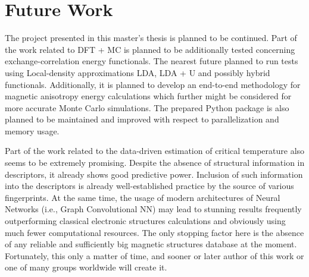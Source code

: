 \section{Future Work}

The project presented in this master's thesis is planned to be continued.
Part of the work related to DFT + MC  is planned to be additionally tested concerning exchange-correlation energy functionals. The nearest future planned to run tests using Local-density approximations LDA, LDA + U and possibly hybrid functionals. Additionally, it is planned to develop an end-to-end methodology for magnetic anisotropy energy calculations which further might be considered for more accurate Monte Carlo simulations. The prepared Python package is also planned to be maintained and improved with respect to parallelization and memory usage.

Part of the work related to the data-driven estimation of critical temperature also seems to be extremely promising. Despite the absence of structural information in descriptors, it already shows good predictive power. Inclusion of such information into the descriptors is already well-established practice by the source of various fingerprints. At the same time, the usage of modern architectures of Neural Networks (i.e., Graph Convolutional NN) may lead to stunning results frequently outperforming classical electronic structures calculations and obviously using much fewer computational resources. The only stopping factor here is the absence of any reliable and sufficiently big magnetic structures database at the moment. Fortunately, this only a matter of time, and sooner or later author of this work or one of many groups worldwide will create it.

\cleardoublepage
